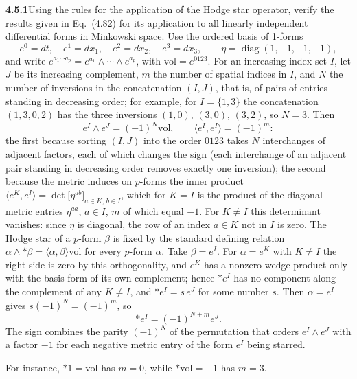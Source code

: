 \par\bigskip
\noindent\textbf{4.5.1}\quad Using the rules for the application of the Hodge
star operator, verify the results given in Eq.~(4.82) for its application to
all linearly independent differential forms in Minkowski space.
\solution
Use the ordered basis of 1-forms
\[
e^0=dt,\quad e^1=dx_1,\quad e^2=dx_2,\quad e^3=dx_3,
\qquad \eta=\operatorname{diag}(1,-1,-1,-1),
\]
and write $e^{a_1\cdots a_p}=e^{a_1}\wedge\cdots\wedge e^{a_p}$,
with $\mathrm{vol}=e^{0123}$. For an increasing index set $I$, let $J$
be its increasing complement, $m$ the number of spatial indices in $I$,
and $N$ the number of inversions in the concatenation $(I,J)$, that is,
of pairs of entries standing in decreasing order; for example, for
$I=\{1,3\}$ the concatenation $(1,3,0,2)$ has the three inversions
$(1,0)$, $(3,0)$, $(3,2)$, so $N=3$. Then
\[
e^I\wedge e^J=(-1)^N\mathrm{vol},\qquad
\langle e^I,e^I\rangle=(-1)^m{:}
\]
the first because sorting $(I,J)$ into the order $0123$ takes $N$
interchanges of adjacent factors, each of which changes the sign (each
interchange of an adjacent pair standing in decreasing order removes
exactly one inversion); the second because the metric induces on
$p$-forms the inner product
$\langle e^K,e^I\rangle=\det\bigl[\eta^{ab}\bigr]_{a\in K,\,b\in I}$,
which for $K=I$ is the product of the diagonal metric entries
$\eta^{aa}$, $a\in I$, $m$ of which equal $-1$. For $K\ne I$ this
determinant vanishes: since $\eta$ is diagonal, the row of an index
$a\in K$ not in $I$ is zero.
The Hodge star of a $p$-form $\beta$ is fixed by the standard defining
relation
$\alpha\wedge *\beta=\langle\alpha,\beta\rangle\mathrm{vol}$ for every
$p$-form $\alpha$. Take $\beta=e^I$. For $\alpha=e^K$ with $K\ne I$ the
right side is zero by this orthogonality, and $e^K$ has a nonzero wedge
product only with the basis form of its own complement; hence $*e^I$
has no component along the complement of any $K\ne I$, and
$*e^I=s\,e^J$ for some number $s$.
Then $\alpha=e^I$ gives $s(-1)^N=(-1)^m$, so
\[
\boxed{*e^I=(-1)^{N+m}e^J}.
\]
The sign combines the parity $(-1)^N$ of the permutation that orders
$e^I\wedge e^J$ with a factor $-1$ for each negative metric entry of
the form $e^I$ being starred.

For instance, $*1=\mathrm{vol}$ has $m=0$, while
$*\mathrm{vol}=-1$ has $m=3$.

